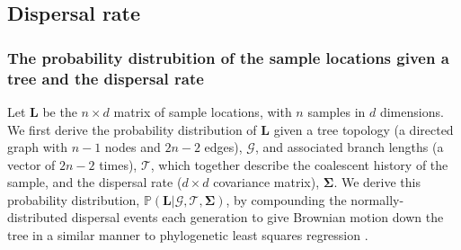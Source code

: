 \documentclass[12pt]{article}
\begin{document}
\subsection*{Dispersal rate}

\subsubsection*{The probability distrubition of the sample locations given a tree and the dispersal rate}

Let $\mathbf{L}$ be the $n\times d$ matrix of sample locations, with $n$ samples in $d$ dimensions.
We first derive the probability distribution of $\mathbf{L}$ given a tree topology (a directed graph with $n-1$ nodes and $2n-2$ edges), $\mathcal{G}$, and associated branch lengths (a vector of $2n-2$ times), $\mathcal{T}$, which together describe the coalescent history of the sample, and the dispersal rate ($d\times d$ covariance matrix), $\mathbf{\Sigma}$. 
We derive this probability distribution, $\mathbb{P}(\mathbf{L} | \mathcal{G},\mathcal{T},\mathbf{\Sigma})$, by compounding the normally-distributed dispersal events each generation to give Brownian motion down the tree in a similar manner to phylogenetic least squares regression \citep{grafen1989phylogenetic,harmon2019phylogenetic}.
\end{document}
